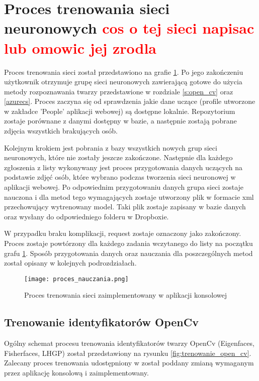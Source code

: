 \section{Proces trenowania sieci neuronowych \textcolor{red}{cos o tej sieci napisac lub omowic jej zrodla}}
Proces trenowania sieci został przedstawiono na grafie \ref{fig:trenowanie_proces}. Po jego zakończeniu użytkownik otrzymuje grupę sieci neuronowych zawierającą gotowe do użycia metody rozpoznawania twarzy przedstawione w rozdziale \ref{s:open_cv} oraz \ref{azurecs}.
Proces zaczyna się od sprawdzenia jakie dane uczące (profile utworzone w zakładce 'People' aplikacji webowej) są dostępne lokalnie. Repozytorium zostaje porównane z danymi dostępny w bazie, a następnie zostają pobrane zdjęcia wszystkich brakujących osób.

Kolejnym krokiem jest pobrania z bazy wszystkich nowych grup sieci neuronowych, które nie zostały jeszcze zakończone. Następnie dla każdego zgłoszenia z listy wykonywany jest proces przygotowania danych uczących na podstawie zdjęć osób, które wybrano podczas tworzenia sieci neuronowej w aplikacji webowej. Po odpowiednim przygotowaniu danych grupa sieci zostaje nauczona i dla metod tego wymagających zostaje utworzony plik w formacie xml przechowujący wytrenowany model. Taki plik zostaje zapisany w bazie danych oraz wysłany do odpowiedniego folderu w Dropboxie.

W przypadku braku komplikacji, request zostaje oznaczony jako zakończony. Proces zostaje powtórzony dla każdego zadania wczytanego do listy na początku grafu \ref{fig:trenowanie_proces}. Sposób przygotowania danych oraz nauczania dla poszczególnych metod został opisany w kolejnych podrozdziałach.
\begin{figure}[H]
	\centering
	\texttt{[image: proces\_nauczania.png]}
	\caption{Proces trenowania sieci zaimplementowany w aplikacji konsolowej}
	\label{fig:trenowanie_proces}
\end{figure}

\subsection{Trenowanie identyfikatorów OpenCv} \label{trenowanie_open_cv}
Ogólny schemat procesu trenowania identyfikatorów twarzy OpenCv (Eigenfaces, Fisherfaces, LHGP) został przedstawiony na rysunku \ref{fig:trenowanie_open_cv}. Zalecany proces trenowania udostępniony w  został poddany zmianą wymaganym przez aplikację konsolową i zaimplementowany.

